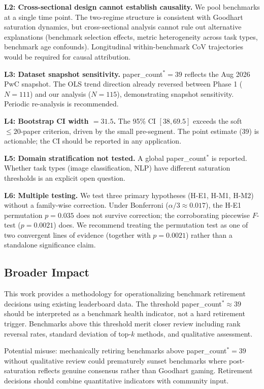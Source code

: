 \textbf{L2: Cross-sectional design cannot establish causality.} We pool benchmarks at a single time point. The two-regime structure is consistent with Goodhart saturation dynamics, but cross-sectional analysis cannot rule out alternative explanations (benchmark selection effects, metric heterogeneity across task types, benchmark age confounds). Longitudinal within-benchmark CoV trajectories would be required for causal attribution.

\textbf{L3: Dataset snapshot sensitivity.} paper\_count$^*=39$ reflects the Aug 2026 PwC snapshot. The OLS trend direction already reversed between Phase 1 ($N=111$) and our analysis ($N=115$), demonstrating snapshot sensitivity. Periodic re-analysis is recommended.

\textbf{L4: Bootstrap CI width $= 31.5$.} The 95\% CI $[38, 69.5]$ exceeds the soft $\leq 20$-paper criterion, driven by the small pre-segment. The point estimate (39) is actionable; the CI should be reported in any application.

\textbf{L5: Domain stratification not tested.} A global paper\_count$^*$ is reported. Whether task types (image classification, NLP) have different saturation thresholds is an explicit open question.

\textbf{L6: Multiple testing.} We test three primary hypotheses (H-E1, H-M1, H-M2) without a family-wise correction. Under Bonferroni ($\alpha/3 \approx 0.017$), the H-E1 permutation $p=0.035$ does not survive correction; the corroborating piecewise $F$-test ($p=0.0021$) does. We recommend treating the permutation test as one of two convergent lines of evidence (together with $p=0.0021$) rather than a standalone significance claim.

\subsection{Broader Impact}

This work provides a methodology for operationalizing benchmark retirement decisions using existing leaderboard data. The threshold paper\_count$^* \approx 39$ should be interpreted as a benchmark health indicator, not a hard retirement trigger. Benchmarks above this threshold merit closer review including rank reversal rates, standard deviation of top-$k$ methods, and qualitative assessment.

Potential misuse: mechanically retiring benchmarks above paper\_count$^*=39$ without qualitative review could prematurely sunset benchmarks where post-saturation reflects genuine consensus rather than Goodhart gaming. Retirement decisions should combine quantitative indicators with community input.
